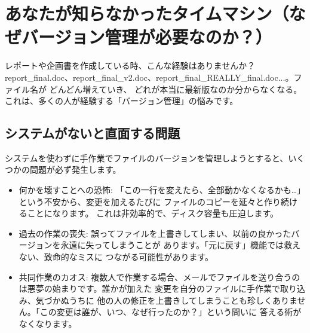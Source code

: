 \documentclass{ltjsarticle}
\begin{document}
\section{あなたが知らなかったタイムマシン（なぜバージョン管理が必要なのか？）}
レポートや企画書を作成している時、こんな経験はありませんか？ 
report\_final.doc、report\_final\_v2.doc、report\_final\_REALLY\_final.doc...。ファイル名が
どんどん増えていき、
どれが本当に最新版なのか分からなくなる。これは、多くの人が経験する「バージョン管理」の悩みです。

\subsection{システムがないと直面する問題}
システムを使わずに手作業でファイルのバージョンを管理しようとすると、いくつかの問題が必ず発生します。
\begin{itemize}
    \item 何かを壊すことへの恐怖: 「この一行を変えたら、全部動かなくなるかも…」という不安から、変更を加えるたびに
		ファイルのコピーを延々と作り続けることになります。
    これは非効率的で、ディスク容量も圧迫します。
    \item 過去の作業の喪失: 誤ってファイルを上書きしてしまい、以前の良かったバージョンを永遠に失ってしまうことが
		あります。「元に戻す」機能では救えない、致命的なミスに
    つながる可能性があります。
    \item 共同作業のカオス: 複数人で作業する場合、メールでファイルを送り合うのは悪夢の始まりです。誰かが加えた
		変更を自分のファイルに手作業で取り込み、気づかぬうちに
    他の人の修正を上書きしてしまうことも珍しくありません。「この変更は誰が、いつ、なぜ行ったのか？」という問いに
		答える術がなくなります。
\end{itemize}
\end{document}
